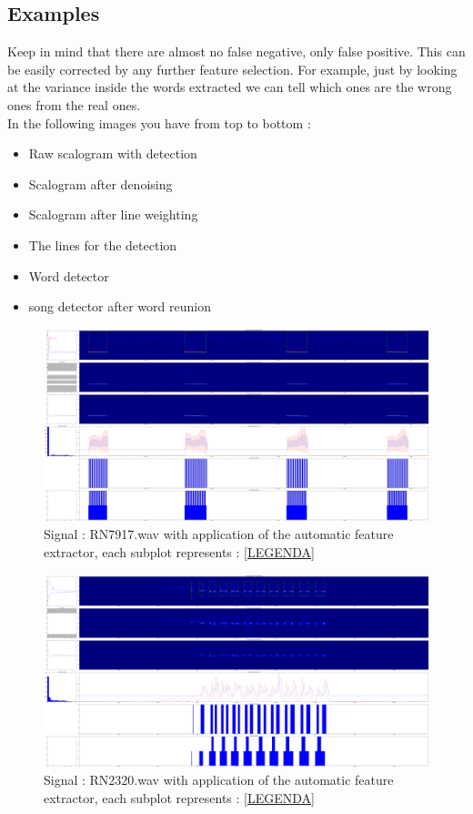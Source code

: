 \documentclass[a4paper]{report}
\begin{document}
\subsection{Examples}
Keep in mind that there are almost no false negative, only false positive. This can be easily corrected by any further feature selection. For example, just by looking at the variance inside the words extracted we can tell which ones are the wrong ones from the real ones.\\
In the following images you have from top to bottom :

\begin{itemize}\label{LEGENDA}
\item Raw scalogram with detection
\item Scalogram after denoising
\item Scalogram after line weighting
\item The lines for the detection
\item Word detector
\item song detector after word reunion
\end{itemize}
\iffalse

\begin{figure}[H]
\begin{center}
\includegraphics[scale=0.07]{1test.png}\caption{Signal : RN7917.wav with application of the automatic feature extractor, each subplot represents : \ref{LEGENDA} }
\end{center}
\end{figure}


\begin{figure}[H]
\begin{center}
\includegraphics[scale=0.07]{2test.png}\caption{Signal : RN2320.wav with application of the automatic feature extractor, each subplot represents : \ref{LEGENDA} }
\end{center}
\end{figure}
\end{document}
